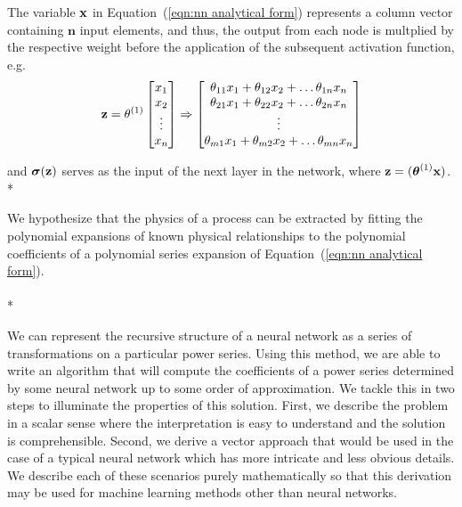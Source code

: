 The variable $\bold x$ in Equation~(\ref{eqn:nn analytical form}) represents a column vector containing $\boldsymbol n$ input elements, and thus, the output from each node is multplied by the respective weight before the application of the subsequent activation function, e.g.
\begin{equation}
	\bold z =
	\theta^{(1)} \begin{bmatrix}
				x_{1} \\
				x_{2} \\
				\vdots \\
				x_{n}
			\end{bmatrix}
	\Rightarrow \begin{bmatrix}
					\theta_{11} x_{1} + \theta_{12} x_{2} + \ldots \theta_{1n} x_{n} \\
					\theta_{21} x_{1} + \theta_{22} x_{2} + \ldots \theta_{2n} x_{n} \\
					\vdots \\
					\theta_{m1} x_{1} + \theta_{m2} x_{2} + \ldots \theta_{mn} x_{n} \\
				\end{bmatrix}
\end{equation}

and $\boldsymbol\sigma (\bold z)$ serves as the input of the next layer in the network, where $\bold z = (\boldsymbol\theta^{(1)} \bold x)$. \\*

We hypothesize that the physics of a process can be extracted by fitting the polynomial expansions of known physical relationships to the polynomial coefficients of a polynomial series expansion of Equation~(\ref{eqn:nn analytical form}). \\
\\*

We can represent the recursive structure of a neural network as a series of transformations on a particular power series. Using this method, we are able to write an algorithm that will compute the coefficients of a power series determined by some neural network up to some order of approximation. We tackle this in two steps to illuminate the properties of this solution. First, we describe the problem in a scalar sense where the interpretation is easy to understand and the solution is comprehensible. Second, we derive a vector approach that would be used in the case of a typical neural network which has more intricate and less obvious details. We describe each of these scenarios purely mathematically so that this derivation may be used for machine learning methods other than neural networks.

